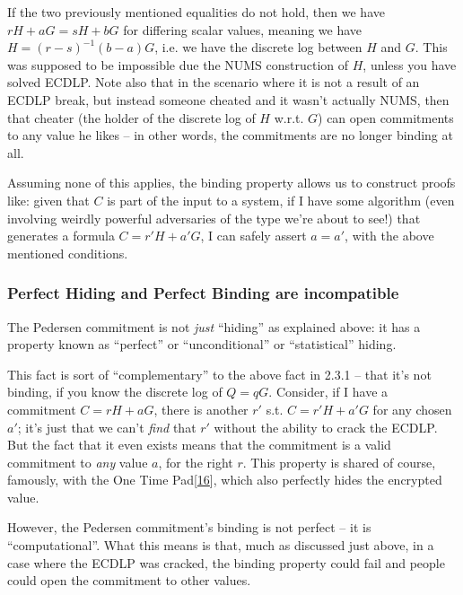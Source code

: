 \documentclass[10pt,a4paper]{article}
\begin{document}
If the two previously mentioned equalities do not hold, then we have $rH + aG = sH+bG$ for
differing scalar values, meaning we have $H = \left(r-s\right)^{-1}(b-a)G$, i.e. we have the discrete log
between $H$ and $G$. This was supposed to be impossible due the NUMS
construction of $H$, unless you have solved ECDLP. Note also that in the
scenario where it is not a result of an ECDLP break, but instead someone
cheated and it wasn't actually NUMS, then that cheater (the holder of
the discrete log of $H$ w.r.t. $G$) can open commitments to any value he likes
-- in other words, the commitments are no longer binding at all.

Assuming none of this applies, the binding property allows us to
construct proofs like: given that $C$ is part of the input to a system, if I
have some algorithm (even involving weirdly powerful adversaries of the
type we're about to see!) that generates a formula $C=r'H + a'G$, I can safely assert $a=a'$, 
with the above mentioned conditions.

\hypertarget{perfect-hiding-and-perfect-binding-are-incompatible}{%
\subsubsection[Perfect Hiding and Perfect Binding are
incompatible]{\texorpdfstring{\protect\hypertarget{anchor-18}{}{}Perfect
Hiding and Perfect Binding are
incompatible}{Perfect Hiding and Perfect Binding are incompatible}}\label{perfect-hiding-and-perfect-binding-are-incompatible}}

The Pedersen commitment is not \emph{just} ``hiding'' as explained
above: it has a property known as ``perfect'' or ``unconditional'' or
``statistical'' hiding.

This fact is sort of ``complementary'' to the above fact in 2.3.1 --
that it's not binding, if you know the discrete log of $Q=qG$. Consider, if I
have a commitment $C=rH+aG$, there is another $r'$ s.t. $C=r'H + a'G$ for any chosen $a'$; it's just that we can't
\emph{find} that $r'$ without the ability to crack the ECDLP. But the fact
that it even exists means that the commitment is a valid commitment to
\emph{any} value $a$, for the right $r$. This property is shared of course,
famously, with the One Time Pad{[}\protect\hyperlink{anchor-19}{16}{]},
which also perfectly hides the encrypted value.

However, the Pedersen commitment's binding is not perfect -- it is
``computational''. What this means is that, much as discussed just
above, in a case where the ECDLP was cracked, the binding property could
fail and people could open the commitment to other values.
\end{document}
